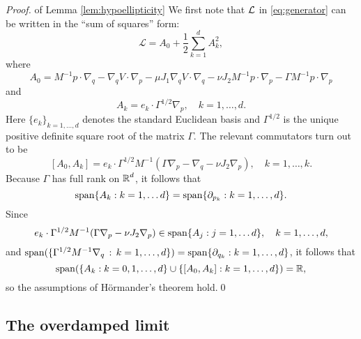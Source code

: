 
\begin{proof} of Lemma \ref{lem:hypoellipticity}
	We first note that $\operatorname{\mathcal{L}}$ in \eqref{eq:generator} can be written in the ``sum of squares'' form:
	$$
	\mathcal{L}=A_{0}+\frac{1}{2}\sum_{k=1}^{d}A_{k}^{2},
	$$
	where 
	$$
	A_{0}=M^{-1}p\cdot\nabla_{q}-\nabla_{q}V\cdot\nabla_{p}-\mu J_{1}\nabla_{q}V\cdot\nabla_{q}-\nu J_{2}M^{-1}p\cdot\nabla_{p}-\Gamma M^{-1}p\cdot\nabla_{p}
	$$
	and
	$$
	A_{k}=e_{k}\cdot\Gamma^{1/2}\nabla_{p}, \quad k = 1,\ldots, d.
	$$
	Here $\lbrace e_k \rbrace_{k=1,\ldots, d}$ denotes the standard Euclidean basis and $\Gamma^{1/2}$ is the unique positive definite square root of the matrix $\Gamma$.   The relevant commutators turn out to be
	\[
	[A_{0},A_{k}]=e_{k}\cdot\Gamma^{1/2} M^{-1}(\Gamma\nabla_{p}-\nabla_{q}-\nu J_{2}\nabla_{p}), \quad k = 1,\ldots, k.
	\]
	Because $\Gamma$ has full rank on $\operatorname{\mathbb{R}}^d$, it follows that 
	\[
	\operatorname{span}\{A_{k}:k=1,\ldots d\}=\operatorname{span}\{\partial_{p_{k}}:k=1,\ldots,d\}.
	\]
	Since
	\[
	e_{k}\cdot\Gamma^{1/2} M^{-1}(\Gamma\nabla_{p}-\nu J_{2}\nabla_{p})\in\operatorname{span}\{A_{j}:j=1,\ldots d\},\quad k=1,\ldots,d,
	\]
	and $\operatorname{span}(\lbrace \Gamma^{1/2}M^{-1}\nabla_q \,:\, k=1,\ldots, d \rbrace) = \operatorname{span}\{\partial_{q_{k}}:k=1,\ldots,d\}$, it follows that
	\[
	\operatorname{span}(\lbrace A_{k}:k=0,1,\ldots,d\rbrace\cup\{[A_{0},A_{k}]:k=1,\ldots,d\}) = \operatorname{\mathbb{R}},
	\]
	so the assumptions of H\"{o}rmander's theorem hold.\qed
\end{proof}

\subsection{The overdamped limit}

